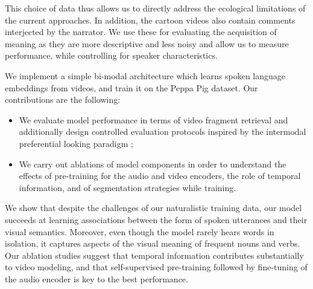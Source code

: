 This choice of data thus allows us to directly address the ecological limitations 
of the current approaches. In addition, the cartoon videos also contain 
comments interjected by the narrator. We use these for evaluating the 
acquisition of meaning as they are more descriptive and less noisy and allow 
us to measure performance, while controlling for speaker characteristics.

We implement a simple bi-modal architecture which learns spoken
language embeddings from videos, and train it on the Peppa Pig dataset.
Our contributions are the following:
\begin{itemize}
\item We evaluate model performance in terms of video fragment
  retrieval and additionally design controlled evaluation
  protocols inspired by the intermodal preferential looking
  paradigm \citep{hirsh1996intermodal};
\item We carry out ablations of model components in order to
  understand the effects of pre-training for the audio and video
  encoders, the role of temporal information, and of segmentation
  strategies while training. 
\end{itemize}
We show that despite the challenges of our naturalistic training data,
our model succeeds at learning associations between the form of spoken 
utterances and their visual semantics. Moreover, even though the model 
rarely hears words in isolation, it captures aspects of the visual meaning 
of frequent nouns and verbs.
Our ablation studies suggest that temporal information contributes
substantially to video modeling, and that self-supervised pre-training
followed by fine-tuning of the audio encoder is key to the best
performance.



